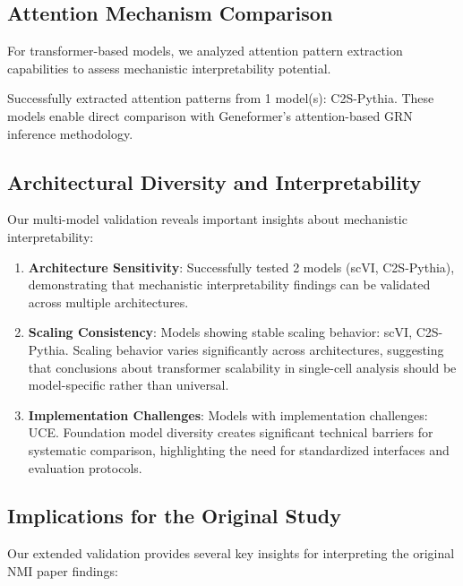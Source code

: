 \subsection{Attention Mechanism Comparison}
\label{subsec:attention_comparison}

For transformer-based models, we analyzed attention pattern extraction capabilities to assess mechanistic interpretability potential.


Successfully extracted attention patterns from 1 model(s): C2S-Pythia. These models enable direct comparison with Geneformer's attention-based GRN inference methodology.


\subsection{Architectural Diversity and Interpretability}
\label{subsec:architectural_diversity}

Our multi-model validation reveals important insights about mechanistic interpretability:

\begin{enumerate}
\item \textbf{Architecture Sensitivity}: Successfully tested 2 models (scVI, C2S-Pythia), demonstrating that mechanistic interpretability findings can be validated across multiple architectures.

\item \textbf{Scaling Consistency}: Models showing stable scaling behavior: scVI, C2S-Pythia. Scaling behavior varies significantly across architectures, suggesting that conclusions about transformer scalability in single-cell analysis should be model-specific rather than universal.

\item \textbf{Implementation Challenges}: Models with implementation challenges: UCE. Foundation model diversity creates significant technical barriers for systematic comparison, highlighting the need for standardized interfaces and evaluation protocols.

\end{enumerate}

\subsection{Implications for the Original Study}
\label{subsec:implications}

Our extended validation provides several key insights for interpreting the original NMI paper findings:

